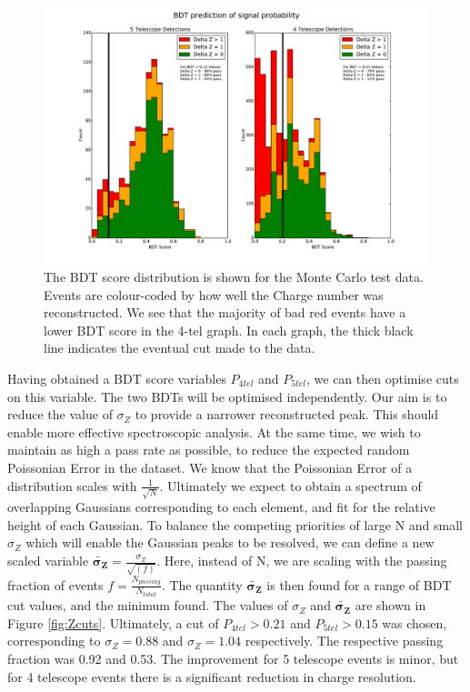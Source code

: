 \documentclass[11pt]{article}
\begin{document}
\begin{figure}
\begin{center}
\includegraphics[width=\textwidth]{Likelihood}
\caption{The BDT score distribution is shown for the Monte Carlo test data. Events are colour-coded by how well the Charge number was reconstructed. We see that the majority of bad red events have a lower BDT score in the 4-tel graph. In each graph, the thick black line indicates the eventual cut made to the data.}
\label{fig:reconBDTdistribution}
\end{center}
\end{figure}

Having obtained a BDT score variables $P_{4tel}$ and $P_{5tel}$, we can then optimise cuts on this variable. The two BDTs will be optimised independently. Our aim is to reduce the value of $\sigma_{Z}$ to provide a narrower reconstructed peak. This should enable more effective spectroscopic analysis. At the same time, we wish to maintain as high a pass rate as possible, to reduce the expected random Poissonian Error in the dataset. We know that the Poissonian Error of a distribution scales with $\frac{1}{\sqrt{N}}$. Ultimately we expect to obtain a spectrum of overlapping Gaussians corresponding to each element, and fit for the relative height of each Gaussian. To balance the competing priorities of large N and small $\sigma_{Z}$ which will enable the Gaussian peaks to be resolved, we can define a new scaled variable $\mathbf{\tilde{\sigma_{Z}}} = \frac{\sigma_{Z}}{\sqrt{(f)}}$. Here, instead of N, we are scaling with the passing fraction of events $f = \frac{N_{passing}}{N_{total}}$. The quantity $\mathbf{\tilde{\sigma_{Z}}}$ is then found for a range of BDT cut values, and the minimum found. The values of $\sigma_{Z}$ and $\mathbf{\tilde{\sigma_{Z}}}$ are shown in Figure \ref{fig:Zcuts}. Ultimately, a cut of $P_{4tel} > 0.21$ and $P_{5tel} > 0.15$ was chosen, corresponding to $\sigma_{Z}=0.88$ and $\sigma_{Z}=1.04$ respectively. The respective passing fraction was 0.92 and 0.53. The improvement for 5 telescope events is minor, but for 4 telescope events there is a significant reduction in charge resolution.
\end{document}
